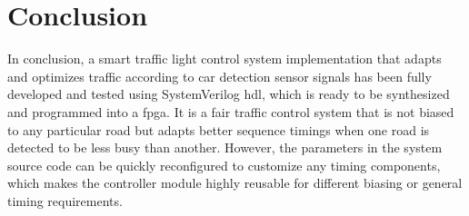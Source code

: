 \section{Conclusion}
In conclusion, a smart traffic light control system implementation that adapts and optimizes traffic according to car detection sensor signals has been fully developed and tested using SystemVerilog \ac{hdl}, which is ready to be synthesized and programmed into a \ac{fpga}. It is a fair traffic control system that is not biased to any particular road but adapts better sequence timings when one road is detected to be less busy than another. However, the parameters in the system source code can be quickly reconfigured to customize any timing components, which makes the controller module highly reusable for different biasing or general timing requirements.